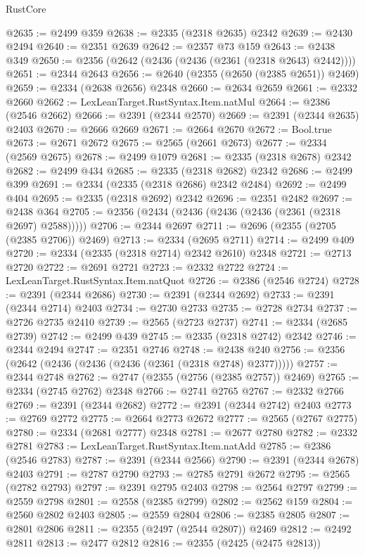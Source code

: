 \begin{lexlean}{RustCore}
\begin{coremodule}
@2635 := @2499 @359
@2638 := @2335 (@2318 @2635) @2342
@2639 := @2430 @2494
@2640 := @2351 @2639
@2642 := @2357 @73 @159
@2643 := @2438 @349
@2650 := @2356 (@2642 (@2436 (@2436 (@2361 (@2318 @2643) @2442))))
@2651 := @2344 @2643
@2656 := @2640 (@2355 (@2650 (@2385 @2651)) @2469)
@2659 := @2334 (@2638 @2656) @2348
@2660 := @2634 @2659
@2661 := @2332 @2660
@2662 := LexLeanTarget.RustSyntax.Item.natMul
@2664 := @2386 (@2546 @2662)
@2666 := @2391 (@2344 @2570)
@2669 := @2391 (@2344 @2635) @2403
@2670 := @2666 @2669
@2671 := @2664 @2670
@2672 := Bool.true
@2673 := @2671 @2672
@2675 := @2565 (@2661 @2673)
@2677 := @2334 (@2569 @2675)
@2678 := @2499 @1079
@2681 := @2335 (@2318 @2678) @2342
@2682 := @2499 @434
@2685 := @2335 (@2318 @2682) @2342
@2686 := @2499 @399
@2691 := @2334 (@2335 (@2318 @2686) @2342 @2484)
@2692 := @2499 @404
@2695 := @2335 (@2318 @2692) @2342
@2696 := @2351 @2482
@2697 := @2438 @364
@2705 := @2356 (@2434 (@2436 (@2436 (@2436 (@2361 (@2318 @2697) @2588)))))
@2706 := @2344 @2697
@2711 := @2696 (@2355 (@2705 (@2385 @2706)) @2469)
@2713 := @2334 (@2695 @2711)
@2714 := @2499 @409
@2720 := @2334 (@2335 (@2318 @2714) @2342 @2610) @2348
@2721 := @2713 @2720
@2722 := @2691 @2721
@2723 := @2332 @2722
@2724 := LexLeanTarget.RustSyntax.Item.natQuot
@2726 := @2386 (@2546 @2724)
@2728 := @2391 (@2344 @2686)
@2730 := @2391 (@2344 @2692)
@2733 := @2391 (@2344 @2714) @2403
@2734 := @2730 @2733
@2735 := @2728 @2734
@2737 := @2726 @2735 @2410
@2739 := @2565 (@2723 @2737)
@2741 := @2334 (@2685 @2739)
@2742 := @2499 @439
@2745 := @2335 (@2318 @2742) @2342
@2746 := @2344 @2494
@2747 := @2351 @2746
@2748 := @2438 @240
@2756 := @2356 (@2642 (@2436 (@2436 (@2436 (@2361 (@2318 @2748) @2377)))))
@2757 := @2344 @2748
@2762 := @2747 (@2355 (@2756 (@2385 @2757)) @2469)
@2765 := @2334 (@2745 @2762) @2348
@2766 := @2741 @2765
@2767 := @2332 @2766
@2769 := @2391 (@2344 @2682)
@2772 := @2391 (@2344 @2742) @2403
@2773 := @2769 @2772
@2775 := @2664 @2773 @2672
@2777 := @2565 (@2767 @2775)
@2780 := @2334 (@2681 @2777) @2348
@2781 := @2677 @2780
@2782 := @2332 @2781
@2783 := LexLeanTarget.RustSyntax.Item.natAdd
@2785 := @2386 (@2546 @2783)
@2787 := @2391 (@2344 @2566)
@2790 := @2391 (@2344 @2678) @2403
@2791 := @2787 @2790
@2793 := @2785 @2791 @2672
@2795 := @2565 (@2782 @2793)
@2797 := @2391 @2795 @2403
@2798 := @2564 @2797
@2799 := @2559 @2798
@2801 := @2558 (@2385 @2799)
@2802 := @2562 @159
@2804 := @2560 @2802 @2403
@2805 := @2559 @2804
@2806 := @2385 @2805
@2807 := @2801 @2806
@2811 := @2355 (@2497 (@2544 @2807)) @2469
@2812 := @2492 @2811
@2813 := @2477 @2812
@2816 := @2355 (@2425 (@2475 @2813))

\end{coremodule}
\end{lexlean}
